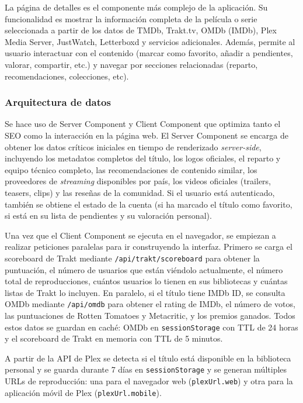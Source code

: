 La página de detalles es el componente más complejo de la aplicación. 
Su funcionalidad es mostrar la información completa de la película o serie seleccionada a partir de los datos de TMDb, Trakt.tv, OMDb (IMDb), Plex Media Server, JustWatch, Letterboxd y servicios adicionales. Además, permite al usuario interactuar con el contenido (marcar como favorito, añadir a pendientes, valorar, compartir, etc.) y navegar por secciones relacionadas (reparto, recomendaciones, colecciones, etc).

\subsubsection{Arquitectura de datos}

Se hace uso de Server Component y Client Component que optimiza tanto el SEO como la interacción en la página web. El Server Component se encarga de obtener los datos críticos iniciales en tiempo de renderizado \textit{server-side}, incluyendo los metadatos completos del título, los logos oficiales, el reparto y equipo técnico completo, las recomendaciones de contenido similar, los proveedores de \textit{streaming} disponibles por país, los videos oficiales (trailers, teasers, clips) y las reseñas de la comunidad. Si el usuario está autenticado, también se obtiene el estado de la cuenta (si ha marcado el título como favorito, si está en su lista de pendientes y su valoración personal).

Una vez que el Client Component se ejecuta en el navegador, se empiezan a realizar peticiones paralelas para ir construyendo la interfaz. Primero se carga el scoreboard de Trakt mediante \texttt{/api/trakt/scoreboard} para obtener la puntuación, el número de usuarios que están viéndolo actualmente, el número total de reproducciones, cuántos usuarios lo tienen en sus bibliotecas y cuántas listas de Trakt lo incluyen. En paralelo, si el título tiene IMDb ID, se consulta OMDb mediante \texttt{/api/omdb} para obtener el rating de IMDb, el número de votos, las puntuaciones de Rotten Tomatoes y Metacritic, y los premios ganados. Todos estos datos se guardan en caché: OMDb en \texttt{sessionStorage} con TTL de 24 horas y el scoreboard de Trakt en memoria con TTL de 5 minutos.

A partir de la API de Plex se detecta si el título está disponible en la biblioteca personal y se guarda durante 7 días en \texttt{sessionStorage} y se generan múltiples URLs de reproducción: una para el navegador web (\texttt{plexUrl.web}) y otra para la aplicación móvil de Plex (\texttt{plexUrl.mobile}).

